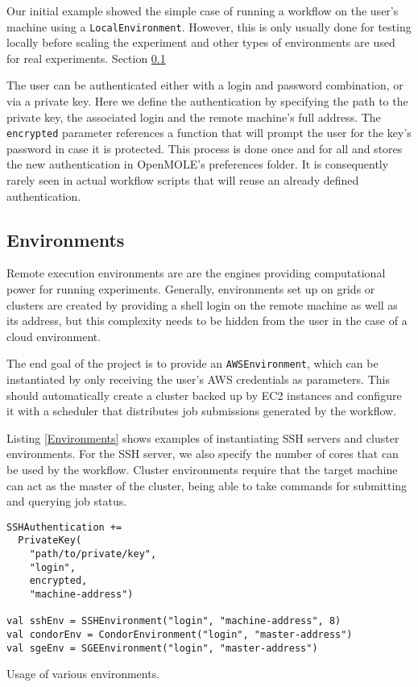 Our initial example showed the simple case of running a workflow on the user's machine using a \verb|LocalEnvironment|. However, this is only usually done for testing locally before scaling the experiment and other types of environments are used for real experiments. Section \ref{EnvironmentsSection}

The user can be authenticated either with a login and password combination, or via a private key. Here we define the authentication by specifying the path to the private key, the associated login and the remote machine's full address. The \verb|encrypted| parameter references a function that will prompt the user for the key's password in case it is protected. This process is done once and for all and stores the new authentication in OpenMOLE's preferences folder. It is consequently rarely seen in actual workflow scripts that will reuse an already defined authentication.

\subsection{Environments} \label{EnvironmentsSection}

Remote execution environments are are the engines providing computational power for running experiments. Generally, environments set up on grids or clusters are created by providing a shell login on the remote machine as well as its address, but this complexity needs to be hidden from the user in the case of a cloud environment.

The end goal of the project is to provide an \verb|AWSEnvironment|, which can be instantiated by only receiving the user's AWS credentials as parameters. This should automatically create a cluster backed up by EC2 instances and configure it with a scheduler that distributes job submissions generated by the workflow.

Listing \ref{Environments} shows examples of instantiating SSH servers and cluster environments. For the SSH server, we also specify the number of cores that can be used by the workflow. Cluster environments require that the target machine can act as the master of the cluster, being able to take commands for submitting and querying job status.

\begin{listing}[h]
	\centering
	\begin{minipage}{11.5cm}
		\begin{verbatim}
SSHAuthentication += 
  PrivateKey(
    "path/to/private/key",
    "login",
    encrypted, 
    "machine-address")

val sshEnv = SSHEnvironment("login", "machine-address", 8)
val condorEnv = CondorEnvironment("login", "master-address")
val sgeEnv = SGEEnvironment("login", "master-address")
		\end{verbatim}
	\end{minipage}
	\caption{Usage of various environments.}
	\label{Environments}
\end{listing}

